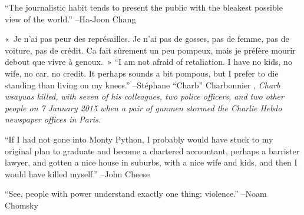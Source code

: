\documentclass{article}%
\begin{document}
\linebreak%
\vspace{1mm}%
\begin{minipage}{\textwidth}%
\flushleft%
“The journalistic habit tends to present the public with the bleakest possible view of the world.”%
\linebreak%
\vspace{1mm}%
–Ha{-}Joon Chang%
\linebreak%
\vspace{1mm}%
\end{minipage}%
\linebreak%
\vspace{1mm}%
\begin{minipage}{\textwidth}%
\flushleft%
«~Je n'ai pas peur des représailles. Je n'ai pas de gosses, pas de femme, pas de voiture, pas de crédit. Ca fait sûrement un peu pompeux, mais je préfère mourir debout que vivre à genoux.~»%
\linebreak%
\vspace{1mm}%
“I am not afraid of retaliation. I have no kids, no wife, no car, no credit. It perhaps sounds a bit pompous, but I prefer to die standing than living on my knees.”%
\linebreak%
–Stéphane “Charb” Charbonnier%
, \textit{Charb wsayuas killed, with seven of his colleagues, two police officers, and two other people on 7 January 2015 when a pair of gunmen stormed the Charlie Hebdo newspaper offices in Paris.}%
\linebreak%
\vspace{1mm}%
\end{minipage}%
\linebreak%
\vspace{1mm}%
\begin{minipage}{\textwidth}%
\flushleft%
“If I had not gone into Monty Python, I probably would have stuck to my original plan to graduate and become a chartered accountant, perhaps a barrister lawyer, and gotten a nice house in suburbs, with a nice wife and kids, and then I would have killed myself.”%
\linebreak%
\vspace{1mm}%
–John Cheese%
\linebreak%
\vspace{1mm}%
\end{minipage}%
\linebreak%
\vspace{1mm}%
\begin{minipage}{\textwidth}%
\flushleft%
“See, people with power understand exactly one thing: violence.”%
\linebreak%
\vspace{1mm}%
–Noam Chomsky%
\linebreak%
\vspace{1mm}%
\end{minipage}%
\end{document}
